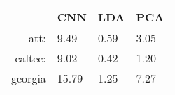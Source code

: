 \begin{tabular}{|r|l|l|l|}
  \hline
    & CNN & LDA & PCA \\
  \hline
  att: & 9.49 & 0.59 & 3.05 \\
  \hline
  caltec: & 9.02 & 0.42 & 1.20 \\
  \hline
  georgia & 15.79 & 1.25 & 7.27 \\
  \hline
\end{tabular}

